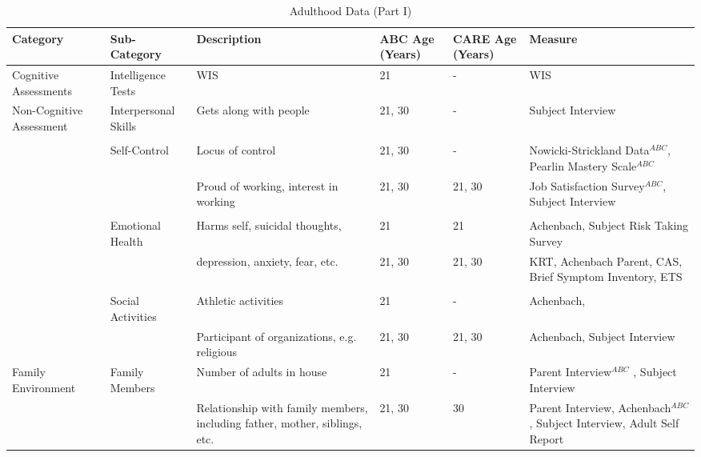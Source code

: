 \begin{sidewaystable}[H]							
\begin{threeparttable}								
\small										
\caption{Adulthood Data (Part I)} \label{tab:adultvars_1}						\centering										
\scriptsize										
\begin{tabular}{L{3.5cm} C{3.5cm} C{5cm} C{1.5cm} C{1.5cm} C{6cm}}										
\hline \hline										
Category        	&	       Sub-Category    	&	       Description     	&	       ABC Age (Years)     	&	       CARE Age (Years)     	&	       Measure\\ \hline
Cognitive Assessments   	&	       Intelligence Tests      	&	       WIS     	&	21	&	-	&	       WIS     \\
\midrule										
Non-Cognitive Assessment        	&	       Interpersonal Skills    	&	       Gets along with people  	&	       21, 30  	&	-	&	       Subject Interview   \\
\\										
        	&	       Self-Control    	&	       Locus of control        	&	       21, 30  	&	-	&	       Nowicki-Strickland Data$^{ABC}$, Pearlin Mastery Scale$^{ABC}$  \\
        	&	               	&	       Proud of working, interest in working   	&	       21, 30  	&	21, 30	&	       Job Satisfaction Survey$^{ABC}$, Subject Interview       \\
\\										
        	&	       Emotional Health        	&	       Harms self, suicidal thoughts,	&	21	&	21	&	       Achenbach,  Subject Risk Taking Survey   \\
        	&	               	&	       depression, anxiety, fear, etc. 	&	       21, 30  	&	21, 30	&	       KRT, Achenbach Parent,  CAS, Brief Symptom Inventory, ETS\\
\\										
        	&	       Social Activities       	&	       Athletic activities     	&	21	&	-	&	       Achenbach,  \\
        	&	               	&	       Participant of organizations, e.g. religious    	&	       21, 30  	&	21, 30	&	       Achenbach, Subject Interview        \\
\midrule										
Family Environment      	&	       Family Members  	&	       Number of adults in house       	&	21	&	-	&	       Parent Interview$^{ABC}$ , Subject Interview    \\
        	&	               	&	       Relationship with family members, including father, mother, siblings, etc.      	&	       21, 30  	&	30	&	      Parent Interview, Achenbach$^{ABC}$, Subject Interview, Adult Self Report \\

\end{tabular}
\end{threeparttable}
\end{sidewaystable}
